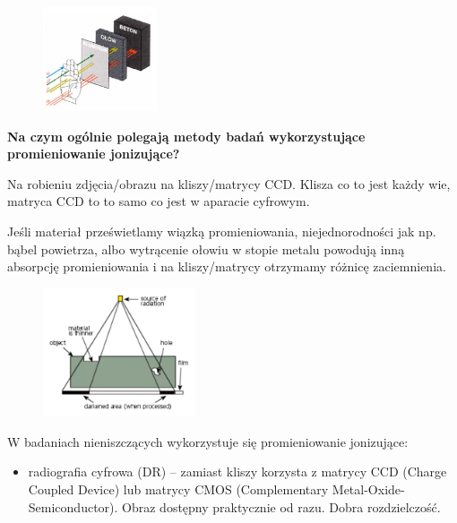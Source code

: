 \documentclass{article}
\begin{document}
\begin{enumerate}
\begin{itemize}
\end{itemize}

\begin{figure}[h!]
\centering
\includegraphics[width=0.3\textwidth]{wiazka}
\end{figure}


{\bf Na czym ogólnie polegają metody badań wykorzystujące promieniowanie jonizujące?}

Na robieniu zdjęcia/obrazu na kliszy/matrycy CCD. Klisza co to jest każdy wie, matryca CCD to to samo co jest w aparacie cyfrowym.

Jeśli materiał prześwietlamy wiązką promieniowania, niejednorodności jak np. bąbel powietrza, albo wytrącenie ołowiu w stopie metalu powodują inną absorpcję promieniowania i na kliszy/matrycy otrzymamy różnicę zaciemnienia.



\begin{figure}[h!]
\centering
\includegraphics[width=0.4\textwidth]{ccd}
\end{figure}

W badaniach nieniszczących wykorzystuje się promieniowanie jonizujące:
\begin{itemize}
\item radiografia cyfrowa (DR) – zamiast kliszy korzysta z matrycy CCD (Charge Coupled Device) lub matrycy CMOS (Complementary Metal-Oxide-Semiconductor). Obraz dostępny praktycznie od razu. Dobra rozdzielczość.


\end{itemize}
\end{enumerate}
\end{document}
